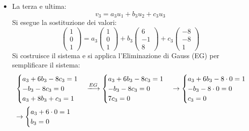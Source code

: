 \documentclass[a4paper]{article}
\begin{document}
\begin{itemize}
		\item La terza e ultima:
		\begin{equation*}
			v_{3} = a_{3} u_{1} + b_{3} u_{2} + c_{3} u_{3}
		\end{equation*}
		Si esegue la sostituzione dei valori:
		\begin{equation*}
			\begin{pmatrix}
				1 \\ 0 \\ 1
			\end{pmatrix} =
			a_{3} \begin{pmatrix}
				1 \\ 0 \\ 1
			\end{pmatrix} +
			b_{3} \begin{pmatrix}
				6 \\ -1 \\ 8
			\end{pmatrix} +
			c_{3} \begin{pmatrix}
				-8 \\ -8 \\ 1
			\end{pmatrix}
		\end{equation*}
		Si costruisce il sistema e si applica l'Eliminazione di Gauss (EG) per semplificare il sistema:
		\begin{equation*}
			\begin{array}{l}
				\begin{cases}
					a_{3} + 6b_{3} - 8c_{3} = 1 \\
					-b_{3} - 8c_{3} = 0 \\
					a_{3} + 8b_{3} + c_{3} = 1
				\end{cases} \xlongrightarrow{EG}
				\begin{cases}
					a_{3} + 6b_{3} - 8c_{3} = 1 \\
					-b_{3} - 8c_{3} = 0 \\
					7c_{3} = 0
				\end{cases} \rightarrow
				\begin{cases}
					a_{3} + 6b_{3} - 8 \cdot 0 = 1 \\
					-b_{3} - 8 \cdot 0 = 0 \\
					c_{3} = 0
				\end{cases} \\ [2em]
				\rightarrow \begin{cases}
					a_{3} + 6 \cdot 0 = 1 \\
					b_{3} = 0 \\

\end{cases}
\end{array}
\end{equation*}
\end{itemize}
\end{document}
